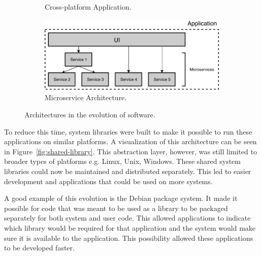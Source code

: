 \begin{figure}[th!]
\begin{subfigure}[t]{.45\textwidth}
		\caption{Cross-platform Application.}
		\label{fig:cross-platform}
	\end{subfigure}%
    \begin{subfigure}[t]{.55\textwidth}
    	\centering
    	\captionsetup{width=.9\linewidth}
    	\includegraphics[width=\linewidth]{images/microservice.pdf}
    	\caption{Microservice Architecture.}
    	\label{fig:microservice}
    \end{subfigure}%
	\caption{Architectures in the evolution of software.}
	\label{fig:evolution}
\end{figure}

\newpage

To reduce this time, system libraries were built to make it possible to run these applications on similar platforms. A visualization of this architecture can be seen in Figure~\ref{fig:shared-library}. This abstraction layer, however, was still limited to broader types of platforms e.g. Linux, Unix, Windows. These shared system libraries could now be maintained and distributed separately. This led to easier development and applications that could be used on more systems.

A good example of this evolution is the Debian package system. It made it possible for code that was meant to be used as a library to be packaged separately for both system and user code. This allowed applications to indicate which library would be required for that application and the system would make sure it is available to the application. This possibility allowed these applications to be developed faster. ~\cite{zacchiroli2011debian}


